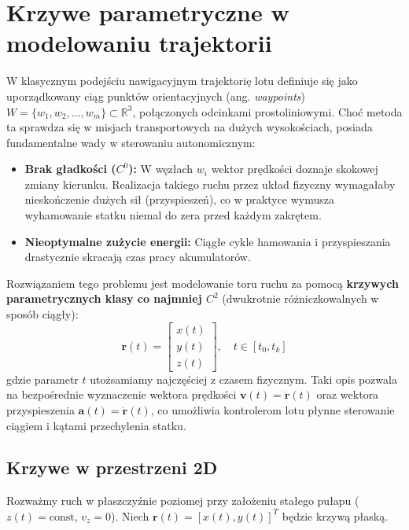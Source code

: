 \section{Krzywe parametryczne w modelowaniu trajektorii}

W klasycznym podejściu nawigacyjnym trajektorię lotu definiuje się jako uporządkowany ciąg punktów orientacyjnych (ang. \textit{waypoints}) $W = \{w_1, w_2, \dots, w_m\} \subset \mathbb{R}^3$, połączonych odcinkami prostoliniowymi. Choć metoda ta sprawdza się w misjach transportowych na dużych wysokościach, posiada fundamentalne wady w sterowaniu autonomicznym:
\begin{itemize}
    \item \textbf{Brak gładkości ($C^0$):} W węzłach $w_i$ wektor prędkości doznaje skokowej zmiany kierunku. Realizacja takiego ruchu przez układ fizyczny wymagałaby nieskończenie dużych sił (przyspieszeń), co w praktyce wymusza wyhamowanie statku niemal do zera przed każdym zakrętem.
    \item \textbf{Nieoptymalne zużycie energii:} Ciągłe cykle hamowania i przyspieszania drastycznie skracają czas pracy akumulatorów.
\end{itemize}

Rozwiązaniem tego problemu jest modelowanie toru ruchu za pomocą \textbf{krzywych parametrycznych klasy co najmniej $C^2$} (dwukrotnie różniczkowalnych w sposób ciągły):
\begin{equation}
    \mathbf{r}(t) = \begin{bmatrix} x(t) \\ y(t) \\ z(t) \end{bmatrix}, \quad t \in [t_0, t_k]
\end{equation}
gdzie parametr $t$ utożsamiamy najczęściej z czasem fizycznym. Taki opis pozwala na bezpośrednie wyznaczenie wektora prędkości $\mathbf{v}(t) = \mathbf{\dot{r}}(t)$ oraz wektora przyspieszenia $\mathbf{a}(t) = \mathbf{\ddot{r}}(t)$, co umożliwia kontrolerom lotu płynne sterowanie ciągiem i kątami przechylenia statku.


\subsection{Krzywe w przestrzeni 2D}

Rozważmy ruch w płaszczyźnie poziomej przy założeniu stałego pułapu ($z(t) = \text{const}$, $v_z = 0$). Niech $\mathbf{r}(t) = [x(t), y(t)]^T$ będzie krzywą płaską. 

